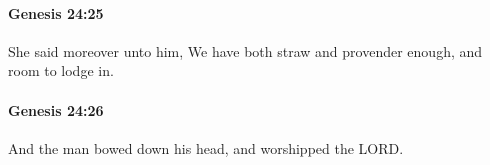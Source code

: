 		\paragraph{Genesis 24:25} %
			\label{GENESIS-24-25}

			She said moreover unto him, We have both straw and provender enough, and room to lodge in.


		\paragraph{Genesis 24:26} %
			\label{GENESIS-24-26}

			And the man bowed down his head, and worshipped the LORD.



